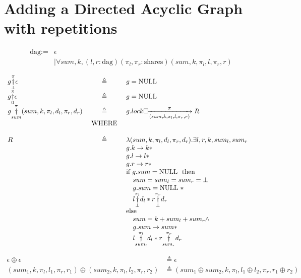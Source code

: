 \documentclass[8pt]{article}
\newcommand{\lock}[2]{ \square \hspace{-1ex} \xrightarrow[#1]{#2}}
\newcommand{\NULL}{\text{NULL }}
\newcommand{\dagt}{\text{dag}{}}
\newcommand{\DAG}[2]{ \underset{#2}{\overset{#1}{\dag}} }
\begin{document}




\newpage
\section{Adding a Directed Acyclic Graph with repetitions}
\begin{align*}
\dagt :=& \epsilon \\
	  &|\forall sum, k, (l, r : \dagt)(\pi_l, \pi_r: \text{shares}) (sum,k, \pi_l, l, \pi_r, r)
\end{align*}

$$
\begin{array}{lcll}
g \DAG{\pi}{\bot} \epsilon &\triangleq&  g =\NULL &\\
g \DAG{\pi}{0} \epsilon &\triangleq&  g =\NULL &\\
g \DAG{\pi}{sum} (sum,k, \pi_l, d_l, \pi_r, d_r)  &\triangleq& g.lock \lock{(sum,k, \pi_l, l, \pi_r, r)}{\pi} R& \\
&\text{ WHERE }&& \\
\\
R &\triangleq& \lambda (sum,k, \pi_l, d_l, \pi_r, d_r).  \exists l, r, k, sum_l, sum_r\\
			 & & g.k \rightarrow k \ast \\
			 &  & g.l \rightarrow l  \ast \\
			&  & g.r \rightarrow r  \ast \\
			 & & \text{if } g.sum = \NULL \text{ then }\\
			 & & \ \ \ sum = sum_l = sum_r = \bot\\
			 & & \ \ \  g.sum = \NULL \ast \\
			 &  & \ \ \ l \DAG{\pi_l}{\bot} d_l \ast
			             r \DAG{\pi_r}{\bot} d_r  \\
			 & & \text{else}\\
			 & & \ \ \ sum = k + sum_l + sum_r \wedge \\
			 & & \ \ \  g.sum \rightarrow sum \ast \\
			 &  & \ \ \ l \DAG{\pi_l}{sum_l} d_l \ast
			            r \DAG{\pi_r}{sum_r} d_r
\end{array}
$$

\begin{align*}
\epsilon \oplus \epsilon & \triangleq \epsilon \\
(sum_1,k, \pi_{l}, l_1, \pi_{r}, r_1)   \oplus (sum_2,k, \pi_{l}, l_2, \pi_{r}, r_2)   & \triangleq  (sum_1\oplus sum_2 ,k, \pi_{l}, l_1 \oplus l_2, \pi_{r}, r_1 \oplus r_2)   \\
\end{align*}
\end{document}
